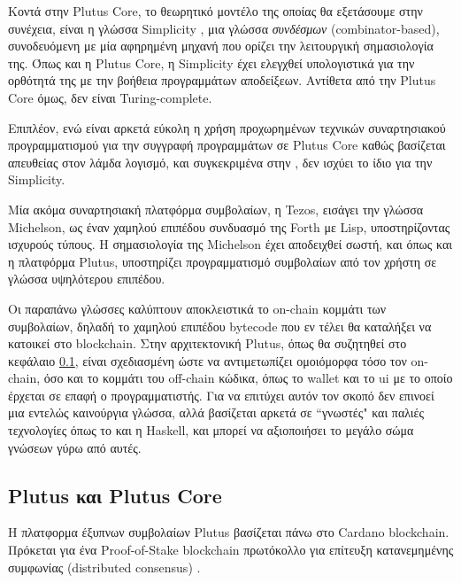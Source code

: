      
     


Κοντά στην Plutus Core, το θεωρητικό μοντέλο της οποίας θα εξετάσουμε στην συνέχεια,
είναι η γλώσσα Simplicity \cite{simplicity}, μια γλώσσα \emph{συνδέσμων} (combinator-based),
συνοδευόμενη με μία αφηρημένη μηχανή που ορίζει την λειτουργική σημασιολογία της. Όπως
και η Plutus Core, η Simplicity έχει ελεγχθεί υπολογιστικά για την ορθότητά της με την βοήθεια
προγραμμάτων αποδείξεων. Αντίθετα από την Plutus Core όμως, δεν είναι Turing-complete.

Επιπλέον, ενώ είναι αρκετά εύκολη η χρήση προχωρημένων τεχνικών συναρτησιακού προγραμματισμού 
για την συγγραφή προγραμμάτων σε Plutus Core καθώς βασίζεται απευθείας στον λάμδα λογισμό, και
συγκεκριμένα στην \FOM{}, δεν ισχύει το ίδιο για την Simplicity. 


Μία ακόμα συναρτησιακή πλατφόρμα συμβολαίων, η Tezos, εισάγει την γλώσσα Michelson,
ως έναν χαμηλού επιπέδου συνδυασμό της Forth με Lisp, υποστηρίζοντας ισχυρούς τύπους.
 Η σημασιολογία της
Michelson έχει αποδειχθεί σωστή, και όπως και η πλατφόρμα Plutus, υποστηρίζει προγραμματισμό
συμβολαίων από τον χρήστη σε γλώσσα υψηλότερου επιπέδου.


Οι παραπάνω γλώσσες καλύπτουν αποκλειστικά το on-chain κομμάτι των συμβολαίων, δηλαδή
το χαμηλού επιπέδου bytecode που εν τέλει θα καταλήξει να κατοικεί στο blockchain. Στην
αρχιτεκτονική Plutus, όπως θα συζητηθεί στο κεφάλαιο \ref{subsec:plutus}, είναι σχεδιασμένη
ώστε να αντιμετωπίζει ομοιόμορφα τόσο τον on-chain, όσο και το κομμάτι του off-chain κώδικα,
όπως το wallet και το ui με το οποίο έρχεται σε επαφή ο προγραμματιστής. Για να επιτύχει αυτόν 
τον σκοπό δεν επινοεί μια εντελώς καινούργια γλώσσα, αλλά βασίζεται αρκετά σε ``γνωστές" και 
παλιές τεχνολογίες όπως το \FOM και η Haskell, και μπορεί να αξιοποιήσει το μεγάλο σώμα γνώσεων
γύρω από αυτές.
         

                            \subsection{Plutus και Plutus Core}
                             \label{subsec:plutus}

                             Η πλατφορμα έξυπνων συμβολαίων Plutus βασίζεται πάνω στο Cardano blockchain. Πρόκεται για ένα
                             Proof-of-Stake blockchain πρωτόκολλο για επίτευξη κατανεμημένης συμφωνίας (distributed consensus) \cite{ouroboros}. 

